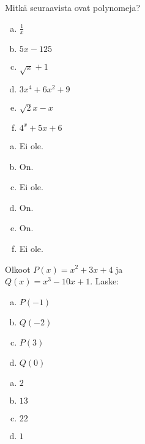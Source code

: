 \begin{tehtavasivu}
\begin{tehtava}
    Mitkä seuraavista ovat polynomeja?
    \begin{enumerate}[a)]
        \item $\frac{1}{x}$
        \item $5x-125$
        \item $\sqrt{x}+1$
        \item $3x^4+6x^2+9$
        \item $\sqrt{2}x-x$
        \item $4^x+5x+6$
    \end{enumerate}
    \begin{vastaus}
        \begin{enumerate}[a)]
            \item Ei ole.
            \item On.
            \item Ei ole.
            \item On.
            \item On.
            \item Ei ole.
        \end{enumerate}
    \end{vastaus}
\end{tehtava}

\begin{tehtava}
    Olkoot $P(x)=x^2+3x+4$ ja \\ $Q(x)=x^3-10x+1$. Laske:
    \begin{enumerate}[a)]
        \item $P(-1)$
        \item $Q(-2)$
        \item $P(3)$
        \item $Q(0)$
    \end{enumerate}
    \begin{vastaus}
        \begin{enumerate}[a)]
            \item $2$
            \item $13$
            \item $22$
            \item $1$
        \end{enumerate}
    \end{vastaus}
\end{tehtava}



\end{tehtavasivu}
